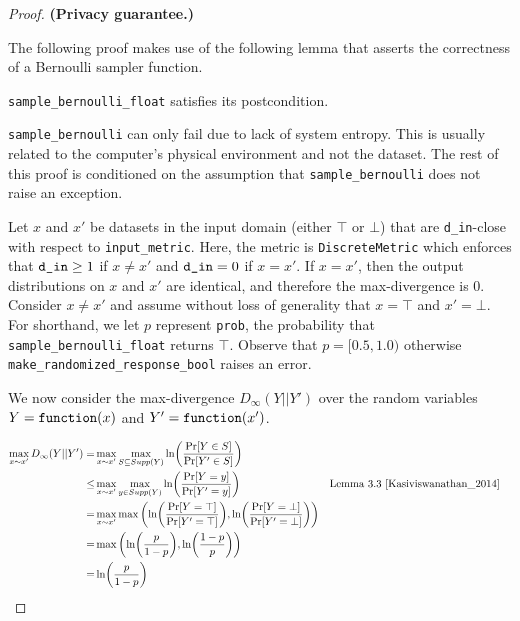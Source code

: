 \documentclass{article}
\begin{document}
\begin{proof}
\textbf{(Privacy guarantee.)}

\begin{tcolorbox}
\begin{note}
    The following proof makes use of the following lemma that asserts the correctness of a Bernoulli sampler function.
    \begin{lemma}
        \texttt{sample\_bernoulli\_float} satisfies its postcondition.
    \end{lemma}
\end{note}
\end{tcolorbox}

\texttt{sample\_bernoulli} can only fail due to lack of system entropy.
This is usually related to the computer's physical environment and not the dataset.
The rest of this proof is conditioned on the assumption that \texttt{sample\_bernoulli} does not raise an exception.

Let $x$ and $x'$ be datasets in the input domain (either $\top$ or $\bot$) that are \texttt{d\_in}-close with respect to \texttt{input\_metric}.
Here, the metric is \texttt{DiscreteMetric} which enforces that $\texttt{d\_in} \geq 1$ if $x \ne x'$ and $\texttt{d\_in} = 0$ if $x = x'$.
If $x = x'$, then the output distributions on $x$ and $x'$ are identical, and therefore the max-divergence is 0.
Consider $x \ne x'$ and assume without loss of generality that $x = \top$ and $x' = \bot$.
For shorthand, we let $p$ represent \texttt{prob}, the probability that \texttt{sample\_bernoulli\_float} returns $\top$.
Observe that $p = [0.5, 1.0)$ otherwise \texttt{make\_randomized\_response\_bool} raises an error.

We now consider the max-divergence $D_{\infty}(Y||Y')$ over the random variables $Y = \texttt{function}(x)$ and $Y' = \texttt{function}(x')$.

\begin{align*}
    \max_{x \sim x'} D_{\infty}(Y||Y')
    =& \max_{x \sim x'} \max_{S \subseteq Supp(Y)}\ln (\frac{\Pr[Y \in S]}{\Pr[Y' \in S]}) \\
    \le& \max_{x \sim x'} \max_{y \in Supp(Y)}\ln (\frac{\Pr[Y = y]}{\Pr[Y' = y]}) &&\text{Lemma 3.3 } \cite{Kasiviswanathan_2014} \\
    =& \max_{x \sim x'} \max\left(\ln (\frac{\Pr[Y = \top]}{\Pr[Y' = \top]}), \ln(\frac{\Pr[Y = \bot]}{\Pr[Y' = \bot]})\right) \\
    =& \max\left(\ln (\frac{p}{1 - p}), \ln(\frac{1 - p}{p})\right) \\
    =& \ln (\frac{p}{1 - p})
\end{align*}


\end{proof}
\end{document}
